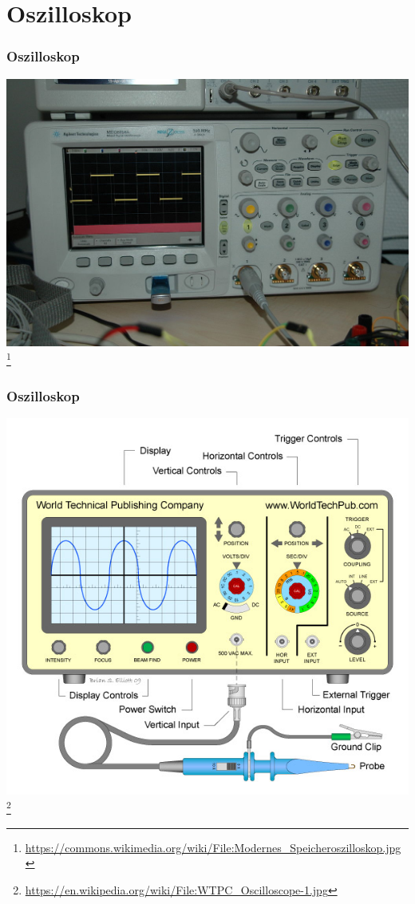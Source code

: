 \section*{Oszilloskop}

\begin{frame}
    \frametitle{Oszilloskop}
    \begin{center}
        \includegraphics[width=1\textwidth,height=.8\textheight,keepaspectratio]{e17/osziModern.jpg}
        \footnote{\tiny \url{https://commons.wikimedia.org/wiki/File:Modernes_Speicheroszilloskop.jpg}}
	\end{center}
\end{frame}

\begin{frame}
    \frametitle{Oszilloskop}
    \begin{center}
        \includegraphics[width=.8\textwidth,height=.8\textheight,keepaspectratio]{e17/WTPCOscilloscopeBeschreiben.jpg}
        \footnote{\tiny \url{https://en.wikipedia.org/wiki/File:WTPC_Oscilloscope-1.jpg}}
	\end{center}
\end{frame}

